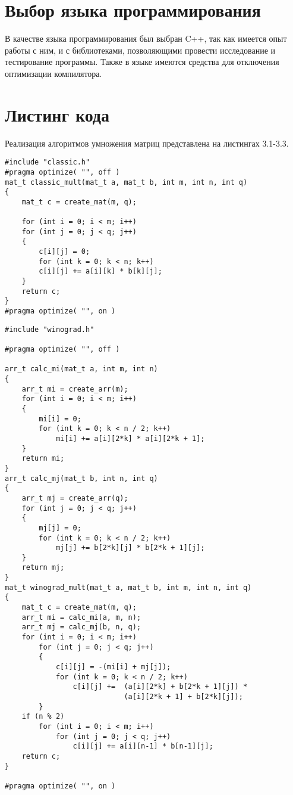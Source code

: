 \section{Выбор языка программирования}
В качестве языка программирования был выбран C++, так как имеется опыт работы с ним, и с библиотеками, позволяющими провести исследование и тестирование программы. Также в языке имеются средства для отключения оптимизации компилятора.


\section{Листинг кода}
Реализация алгоритмов умножения матриц представлена на листингах 3.1-3.3.

\begin{lstlisting}[caption = Функция умножения матриц классическим алгоритмом.]
#include "classic.h"
#pragma optimize( "", off )
mat_t classic_mult(mat_t a, mat_t b, int m, int n, int q)
{
	mat_t c = create_mat(m, q);
	
	for (int i = 0; i < m; i++)
	for (int j = 0; j < q; j++)
	{
		c[i][j] = 0;
		for (int k = 0; k < n; k++)
		c[i][j] += a[i][k] * b[k][j];
	}
	return c;
}
#pragma optimize( "", on )
\end{lstlisting}

\begin{lstlisting}[caption = Функция умножения матриц алгоритмом Винограда.]
#include "winograd.h"

#pragma optimize( "", off )

arr_t calc_mi(mat_t a, int m, int n)
{
	arr_t mi = create_arr(m);
	for (int i = 0; i < m; i++)
	{
		mi[i] = 0;
		for (int k = 0; k < n / 2; k++)
			mi[i] += a[i][2*k] * a[i][2*k + 1];
	}
	return mi;
}
arr_t calc_mj(mat_t b, int n, int q)
{
	arr_t mj = create_arr(q);
	for (int j = 0; j < q; j++)
	{
		mj[j] = 0;
		for (int k = 0; k < n / 2; k++)
			mj[j] += b[2*k][j] * b[2*k + 1][j];
	}
	return mj;
}
mat_t winograd_mult(mat_t a, mat_t b, int m, int n, int q)
{
	mat_t c = create_mat(m, q);
	arr_t mi = calc_mi(a, m, n);
	arr_t mj = calc_mj(b, n, q);
	for (int i = 0; i < m; i++)
		for (int j = 0; j < q; j++)
		{
			c[i][j] = -(mi[i] + mj[j]);
			for (int k = 0; k < n / 2; k++)
				c[i][j] +=	(a[i][2*k] + b[2*k + 1][j]) * 
							(a[i][2*k + 1] + b[2*k][j]);
		}
	if (n % 2)
		for (int i = 0; i < m; i++)
			for (int j = 0; j < q; j++)
				c[i][j] += a[i][n-1] * b[n-1][j];
	return c;
}

#pragma optimize( "", on )
\end{lstlisting}

